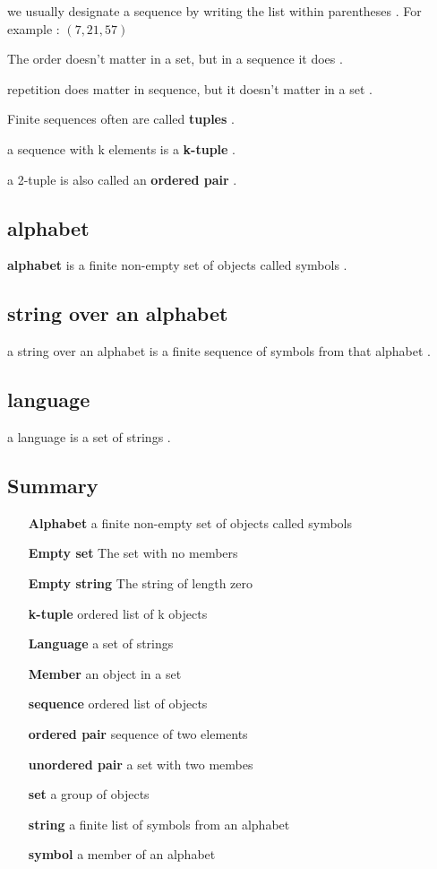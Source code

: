 \documentclass[12pt]{article}
\begin{document}
\noindent
we usually designate a sequence by writing the list within parentheses . For example : $
( 7 , 21 , 57 )
$

\noindent
The order doesn't matter in a set, but in a sequence it does .

\noindent
repetition does matter in sequence, but it doesn't matter in a set .

\noindent
Finite sequences often are called \textbf{tuples} .

\noindent
a sequence with k elements is a \textbf{k-tuple} .

\noindent
a 2-tuple is also called an \textbf{ordered pair} .


\subsection{alphabet}

\textbf{alphabet} is a finite non-empty set of objects called symbols .


\subsection{string over an alphabet}

a string over an alphabet is a finite sequence of symbols from that alphabet .

\subsection{language}

a language is a set of strings .


\subsection{Summary}

\begin{itemize}
	\item [\textbf{Alphabet}] a finite non-empty set of objects called symbols 
	\item [\textbf{Empty set}] The set with no members 
	\item [\textbf{Empty string}] The string of length zero 
	\item [\textbf{k-tuple}] ordered list of k objects 
	\item [\textbf{Language}] a set of strings 
	\item [\textbf{Member}] an object in a set 
	\item [\textbf{sequence}] ordered list of objects 
	\item [\textbf{ordered pair}] sequence of two elements 
	\item [\textbf{unordered pair}] a set with two membes 
	\item [\textbf{set}] a group of objects 
	\item [\textbf{string}] a finite list of symbols from an alphabet
	\item [\textbf{symbol}] a member of an alphabet
\end{itemize}
\end{document}

